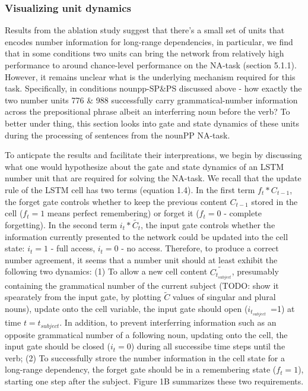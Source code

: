 \subsubsection{Visualizing unit dynamics}
Results from the ablation study suggest that there's a small set of units that encodes number information for long-range dependencies, in particular, we find that in some conditions two units can bring the network from relatively high performance to around chance-level performance on the NA-task (section 5.1.1). However, it remains unclear what is the underlying mechanism required for this task. Specifically, in conditions nounpp-SP\&PS discussed above - how exactly the two number units 776 \& 988 successfully carry grammatical-number information across the prepositional phrase albeit an interferring noun before the verb? To better under thing, this section looks into gate and state dynamics of these units during the processing of sentences from the nounPP NA-task. 

To anticpate the results and facilitate their interpreations, we begin by discussing what one would hypothesize about the gate and state dynamics of an LSTM number unit that are required for solving the NA-task. We recall that the update rule of the LSTM cell has two terms (equation 1.4). In the first term $f_t * C_{t-1}$, the forget gate controls whether to keep the previous content $C_{t-1}$ stored in the cell ($f_t=1$ means perfect remembering) or forget it ($f_t=0$ - complete forgetting). In the second term $i_t*\tilde{C_t}$, the input gate controls whether the information currently presented to the network could be updated into the cell state: $i_t=1$ - full access, $i_t=0$ - no access. Therefore, to produce a correct number agreement, it seems that a number unit should at least exhibit the following two dynamics: (1) To allow a new cell content $\tilde{C_t_{subject}}$, presumably containing the grammatical number of the current subject (TODO: show it spearately from the input gate, by plotting $\tilde{C}$ values of singular and plural nouns), update onto the cell variable, the input gate should open ($i_t_{subject}$~=1) at time $t=t_{subject}$. In addition, to prevent interferring information such as an opposite grammatical number of a following noun, updating onto the cell, the input gate should be closed ($i_t=0$) during all successibe time steps until the verb; (2) To successfully strore the number information in the cell state for a long-range dependency, the forget gate should be in a remembering state ($f_t=1$), starting one step after the subject. Figure 1B summarizes these two requirements.  

